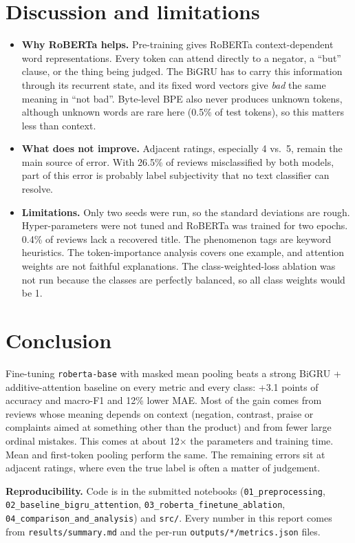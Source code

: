 \documentclass[11pt,a4paper]{article}
\begin{document}
\section{Discussion and limitations}
\begin{itemize}
\item \textbf{Why RoBERTa helps.} Pre-training gives RoBERTa context-dependent word representations. Every token can attend directly to a negator, a ``but'' clause, or the thing being judged. The BiGRU has to carry this information through its recurrent state, and its fixed word vectors give \textit{bad} the same meaning in ``not bad''. Byte-level BPE also never produces unknown tokens, although unknown words are rare here (0.5\% of test tokens), so this matters less than context.
\item \textbf{What does not improve.} Adjacent ratings, especially 4 vs.\ 5, remain the main source of error. With 26.5\% of reviews misclassified by both models, part of this error is probably label subjectivity that no text classifier can resolve.
\item \textbf{Limitations.} Only two seeds were run, so the standard deviations are rough. Hyper-parameters were not tuned and RoBERTa was trained for two epochs. 0.4\% of reviews lack a recovered title. The phenomenon tags are keyword heuristics. The token-importance analysis covers one example, and attention weights are not faithful explanations. The class-weighted-loss ablation was not run because the classes are perfectly balanced, so all class weights would be 1.
\end{itemize}

\section{Conclusion}
Fine-tuning \texttt{roberta-base} with masked mean pooling beats a strong BiGRU + additive-attention baseline on every metric and every class: +3.1 points of accuracy and macro-F1 and 12\% lower MAE. Most of the gain comes from reviews whose meaning depends on context (negation, contrast, praise or complaints aimed at something other than the product) and from fewer large ordinal mistakes. This comes at about 12$\times$ the parameters and training time. Mean and first-token pooling perform the same. The remaining errors sit at adjacent ratings, where even the true label is often a matter of judgement.

\textbf{Reproducibility.} Code is in the submitted notebooks (\texttt{01\_preprocessing}, \texttt{02\_baseline\_bigru\_attention}, \texttt{03\_roberta\_finetune\_ablation}, \texttt{04\_comparison\_and\_analysis}) and \texttt{src/}. Every number in this report comes from \texttt{results/summary.md} and the per-run \texttt{outputs/*/metrics.json} files.
\end{document}
